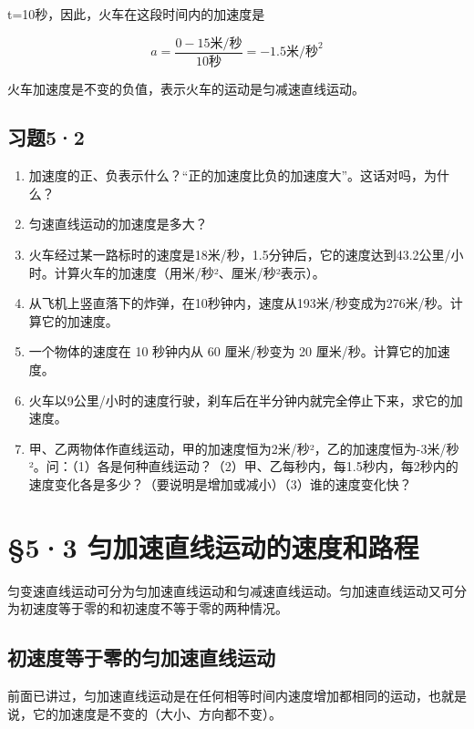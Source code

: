 t=10秒，因此，火车在这段时间内的加速度是

\[
a = \frac {0 - 15 \text{米/秒}}{10 \text{秒}} = - 1.5 \text{米/秒} ^ {2}
\]

火车加速度是不变的负值，表示火车的运动是匀减速直线运动。

\subsection{习题5·2}\label{ux4e60ux989852}

\begin{enumerate}
\def\labelenumi{\arabic{enumi}.}
\item
  加速度的正、负表示什么？``正的加速度比负的加速度大''。这话对吗，为什么？
\item
  匀速直线运动的加速度是多大？
\item
  火车经过某一路标时的速度是18米/秒，1.5分钟后，它的速度达到43.2公里/小时。计算火车的加速度（用米/秒²、厘米/秒²表示）。
\item
  从飞机上竖直落下的炸弹，在10秒钟内，速度从193米/秒变成为276米/秒。计算它的加速度。
\item
  一个物体的速度在 10 秒钟内从 60 厘米/秒变为 20
  厘米/秒。计算它的加速度。
\item
  火车以9公里/小时的速度行驶，刹车后在半分钟内就完全停止下来，求它的加速度。
\item
  甲、乙两物体作直线运动，甲的加速度恒为2米/秒²，乙的加速度恒为-3米/秒²。问：（1）各是何种直线运动？（2）甲、乙每秒内，每1.5秒内，每2秒内的速度变化各是多少？（要说明是增加或减小）（3）谁的速度变化快？
\end{enumerate}

\section{§5·3
匀加速直线运动的速度和路程}\label{ux5300ux52a0ux901fux76f4ux7ebfux8fd0ux52a8ux7684ux901fux5ea6ux548cux8defux7a0b}

匀变速直线运动可分为匀加速直线运动和匀减速直线运动。匀加速直线运动又可分为初速度等于零的和初速度不等于零的两种情况。

\subsection{初速度等于零的匀加速直线运动}\label{ux521dux901fux5ea6ux7b49ux4e8eux96f6ux7684ux5300ux52a0ux901fux76f4ux7ebfux8fd0ux52a8}

前面已讲过，匀加速直线运动是在任何相等时间内速度增加都相同的运动，也就是说，它的加速度是不变的（大小、方向都不变）。

